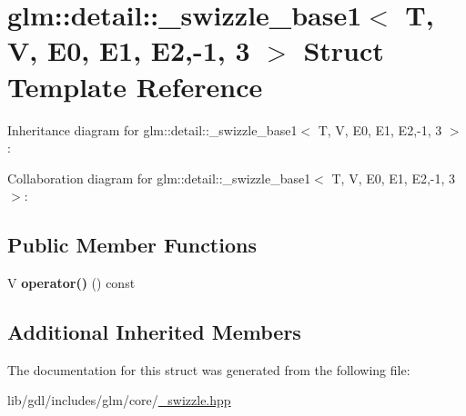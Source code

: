 \hypertarget{structglm_1_1detail_1_1__swizzle__base1_3_01_t_00_01_v_00_01_e0_00_01_e1_00_01_e2_00-1_00_013_01_4}{}\section{glm\+:\+:detail\+:\+:\+\_\+swizzle\+\_\+base1$<$ T, V, E0, E1, E2,-\/1, 3 $>$ Struct Template Reference}
\label{structglm_1_1detail_1_1__swizzle__base1_3_01_t_00_01_v_00_01_e0_00_01_e1_00_01_e2_00-1_00_013_01_4}


Inheritance diagram for glm\+:\+:detail\+:\+:\+\_\+swizzle\+\_\+base1$<$ T, V, E0, E1, E2,-\/1, 3 $>$\+:


Collaboration diagram for glm\+:\+:detail\+:\+:\+\_\+swizzle\+\_\+base1$<$ T, V, E0, E1, E2,-\/1, 3 $>$\+:
\subsection*{Public Member Functions}
\begin{DoxyCompactItemize}
\item 
\hypertarget{structglm_1_1detail_1_1__swizzle__base1_3_01_t_00_01_v_00_01_e0_00_01_e1_00_01_e2_00-1_00_013_01_4_a76abd8070d51fabf296fa625bfaa2302}{}V {\bfseries operator()} () const \label{structglm_1_1detail_1_1__swizzle__base1_3_01_t_00_01_v_00_01_e0_00_01_e1_00_01_e2_00-1_00_013_01_4_a76abd8070d51fabf296fa625bfaa2302}

\end{DoxyCompactItemize}
\subsection*{Additional Inherited Members}


The documentation for this struct was generated from the following file\+:\begin{DoxyCompactItemize}
\item 
lib/gdl/includes/glm/core/\hyperlink{__swizzle_8hpp}{\+\_\+swizzle.\+hpp}\end{DoxyCompactItemize}
